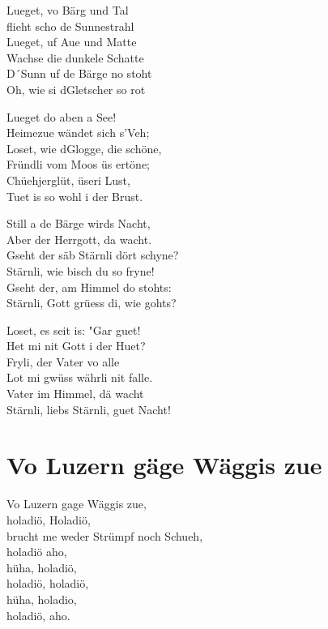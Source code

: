 \documentclass[
  letterpaper,
]{scrbook}
\begin{document}
Lueget, vo Bärg und Tal\\
flieht scho de Sunnestrahl\\
Lueget, uf Aue und Matte\\
Wachse die dunkele Schatte\\
D´Sunn uf de Bärge no stoht\\
Oh, wie si d\textquotesingle Gletscher so rot

Lueget do aben a See!\\
Heimezue wändet sich s'Veh;\\
Loset, wie d\textquotesingle Glogge, die schöne,\\
Fründli vom Moos üs ertöne;\\
Chüehjerglüt, üseri Lust,\\
Tuet is so wohl i der Brust.

Still a de Bärge wird\textquotesingle s Nacht,\\
Aber der Herrgott, da wacht.\\
Gseht der säb Stärnli dört schyne?\\
Stärnli, wie bisch du so fryne!\\
Gseht der, am Himmel do stoht\textquotesingle s:\\
Stärnli, Gott grüess di, wie goht\textquotesingle s?

Loset, es seit is: "Gar guet!\\
Het mi nit Gott i der Huet?\\
Fryli, der Vater vo alle\\
Lot mi gwüss währli nit falle.\\
Vater im Himmel, dä wacht\\
Stärnli, liebs Stärnli, guet Nacht!

\hypertarget{vo-luzern-guxe4ge-wuxe4ggis-zue}{%
\chapter{Vo Luzern gäge Wäggis
zue}\label{vo-luzern-guxe4ge-wuxe4ggis-zue}}

Vo Luzern gage Wäggis zue,\\
holadiö, Holadiö,\\
brucht me weder Strümpf noch Schueh,\\
holadiö aho,\\
hüha, holadiö,\\
holadiö, holadiö,\\
hüha, holadio,\\
holadiö, aho.
\end{document}

